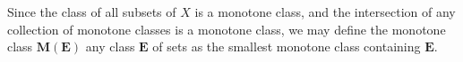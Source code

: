 Since the class of all subsets of $X$ is a monotone class, and the intersection of any collection of monotone classes is a monotone class, we may define the monotone class $\mathbf{M}(\mathbf{E})$  any class $\mathbf{E}$ of sets as the smallest monotone class containing $\mathbf{E}$.
